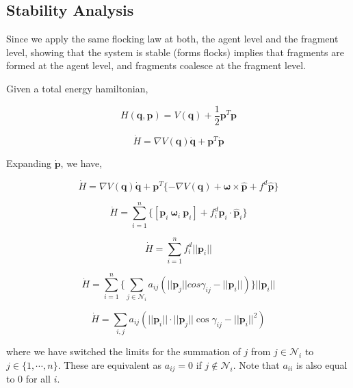 \documentclass[letterpaper, 10 pt, conference]{ieeeconf}  %
\begin{document}
\subsection{Stability Analysis}

Since we apply the same flocking law at both, the agent level and the fragment level, showing that the system is stable (forms flocks) implies that fragments are formed at the agent level, and fragments coalesce at the fragment level. 

Given a total energy hamiltonian,

\begin{equation}
    H(\mathbf{q}, \mathbf{p}) = V(\mathbf{q}) + \frac{1}{2}\mathbf{p}^T\mathbf{p} 
\end{equation}

\begin{equation}
    \dot{H} = \nabla V(\mathbf{q}) \dot{\mathbf{q}} + \mathbf{p}^T\dot{\mathbf{p}}
\end{equation}

Expanding $\dot{\mathbf{p}}$, we have,

\begin{equation}
    \dot{H} = \nabla V(\mathbf{q}) \dot{\mathbf{q}} + \mathbf{p}^T\{ -\nabla V(\mathbf{q}) + \boldsymbol{\omega}\times\hat{\mathbf{p}} + f^d \hat{\mathbf{p}} \}
\end{equation}

\begin{equation}
    \dot{H} = \sum_{i=1}^n \{[\mathbf{p}_i \ \boldsymbol{\omega}_i \ \mathbf{p}_i] + f_i^d \mathbf{p}_i \cdot \hat{\mathbf{p}}_i\}
\end{equation}

\begin{equation}
    \dot{H} = \sum_{i=1}^n f_i^d ||\mathbf{p}_i|| 
\end{equation}

\begin{equation}
    \dot{H} = \sum_{i=1}^n \{ \sum_{j \in \mathcal{N}_i} a_{ij}(||\mathbf{p}_j||cos\gamma_{ij} - ||\mathbf{p}_i||) \} ||\mathbf{p}_i||
\end{equation}

\begin{equation}
    \dot{H} = \sum_{i, j} a_{ij} (||\mathbf{p}_i|| \cdot ||\mathbf{p}_j|| \cos\gamma_{ij} - ||\mathbf{p}_i||^2) 
\end{equation}

where we have switched the limits for the summation of $j$ from $j \in \mathcal{N}_i$ to $j \in \{1, \cdots, n\}$. These are equivalent as $a_{ij} = 0$ if $j \notin \mathcal{N}_i$. Note that $a_{ii}$ is also equal to $0$ for all $i$.
\end{document}

